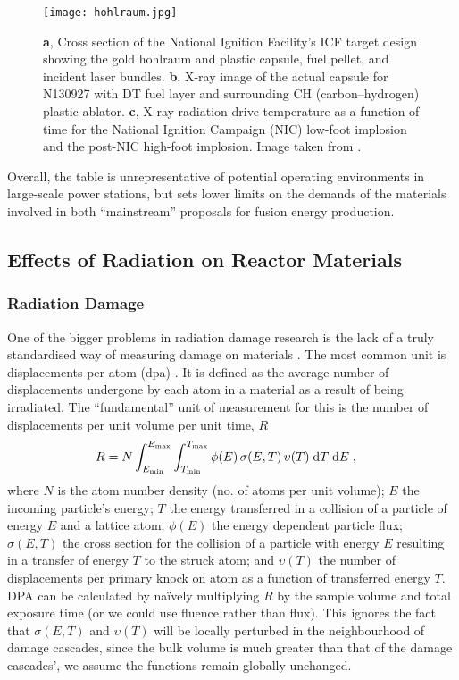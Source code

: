 \begin{figure}[t]
	\centering
	\texttt{[image: hohlraum.jpg]}
	\caption[Hohlraum design for indirect drive in Inertial Confinement Fusion.]{\textbf{a}, Cross section of the National Ignition Facility's ICF target design showing the gold hohlraum and plastic capsule, fuel pellet, and incident laser bundles. \textbf{b}, X-ray image of the actual capsule for N130927 with DT fuel layer and surrounding CH (carbon–hydrogen) plastic ablator. \textbf{c}, X-ray radiation drive temperature as a function of time for the National Ignition Campaign (NIC) low-foot implosion and the post-NIC high-foot implosion. Image taken from \cite{hohlraum}.}
	\label{f:hohlraum}
\end{figure}

Overall, the table is unrepresentative of potential operating environments in large-scale power stations, but sets lower limits on the demands of the materials involved in both ``mainstream'' proposals for fusion energy production.

\subsection{Effects of Radiation on Reactor Materials}
\label{ss:rad_effect_mat}
\subsubsection{Radiation Damage}
\label{sss:rad_damage}
One of the bigger problems in radiation damage research is the lack of a truly standardised way of measuring damage on materials \cite{srimisbad}. The most common unit is displacements per atom (dpa) \cite{dpa}. It is defined as the average number of displacements undergone by each atom in a material as a result of being irradiated. The ``fundamental'' unit of measurement for this is the number of displacements per unit volume per unit time, $R$
\begin{align}
	R & = N\int _{E_{\textrm{min}}}^{E_{\textrm{max}}}\int _{T_{\textrm{min}}}^{T_{\textrm{max}}}\phi (E)\,\sigma (E,T)\,\upsilon (T)\;\textrm{d}T\;\textrm{d}E\;,
\end{align}
where $ N $ is the atom number density (no. of atoms per unit volume); $ E $ the incoming particle's energy; $ T $ the energy transferred in a collision of a particle of energy $E$ and a lattice atom; $ \phi(E) $ the energy dependent particle flux; $ \sigma(E,T) $ the cross section for the collision of a particle with energy $ E $ resulting in a transfer of energy $ T $ to the struck atom; and $ \upsilon(T) $ the number of displacements per primary knock on atom as a function of transferred energy $ T $. DPA can be calculated by na\"{i}vely multiplying $ R $ by the sample volume and total exposure time (or we could use fluence rather than flux). This ignores the fact that $\sigma (E,T)$ and $\upsilon (T)$ will be locally perturbed in the neighbourhood of damage cascades, since the bulk volume is much greater than that of the damage cascades', we assume the functions remain globally unchanged.


